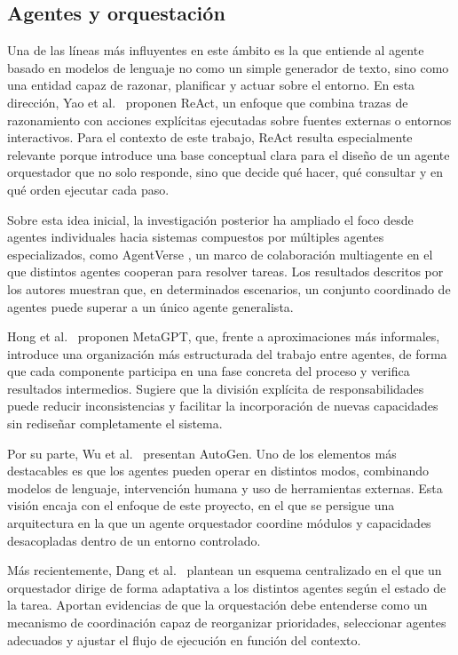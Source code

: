 \subsection{Agentes y orquestación}

Una de las líneas más influyentes en este ámbito es la que entiende al agente basado en modelos de lenguaje no como un simple generador de texto, sino como una entidad capaz de razonar, planificar y actuar sobre el entorno. 
En esta dirección, Yao et al.\ \cite{yao2023react} proponen ReAct, un enfoque que combina trazas de razonamiento con acciones explícitas ejecutadas sobre fuentes externas o entornos interactivos. 
Para el contexto de este trabajo, ReAct resulta especialmente relevante porque introduce una base conceptual clara para el diseño de un agente orquestador que no solo responde, sino que decide qué hacer, qué consultar y en qué orden ejecutar cada paso.

Sobre esta idea inicial, la investigación posterior ha ampliado el foco desde agentes individuales hacia sistemas compuestos por múltiples agentes especializados, como AgentVerse \parencite{chen2024agentverse}, un marco de colaboración multiagente en el que distintos agentes cooperan para resolver tareas.
Los resultados descritos por los autores muestran que, en determinados escenarios, un conjunto coordinado de agentes puede superar a un único agente generalista. 

Hong et al.\ \parencite{hong2024metagpt} proponen MetaGPT, que, frente a aproximaciones más informales, introduce una organización más estructurada del trabajo entre agentes, de forma que cada componente participa en una fase concreta del proceso y verifica resultados intermedios. 
Sugiere que la división explícita de responsabilidades puede reducir inconsistencias y facilitar la incorporación de nuevas capacidades sin rediseñar completamente el sistema.

Por su parte, Wu et al.\ \cite{wu2024autogen} presentan AutoGen. Uno de los elementos más destacables es que los agentes pueden operar en distintos modos, combinando modelos de lenguaje, intervención humana y uso de herramientas externas. 
Esta visión encaja con el enfoque de este proyecto, en el que se persigue una arquitectura en la que un agente orquestador coordine módulos y capacidades desacopladas dentro de un entorno controlado.

Más recientemente, Dang et al.\ \cite{dang2025evolving} plantean un esquema centralizado en el que un orquestador dirige de forma adaptativa a los distintos agentes según el estado de la tarea. 
Aportan evidencias de que la orquestación debe entenderse como un mecanismo de coordinación capaz de reorganizar prioridades, seleccionar agentes adecuados y ajustar el flujo de ejecución en función del contexto.


